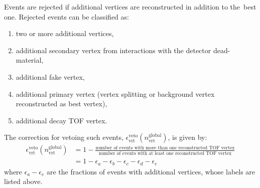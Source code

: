 Events are rejected if additional vertices are reconstructed in addition to the~best one. Rejected events can be classified as:

\begin{enumerate}[label=\alph*)]
	\item two or more additional vertices,
	\item additional  secondary vertex from interactions with the detector dead-material,
	\item additional fake  vertex,
	\item additional primary  vertex (vertex splitting or background vertex reconstructed as best vertex),
	\item additional decay TOF vertex.  
\end{enumerate}
The correction for vetoing such events, $\epsilon_\textrm{vrt}^\textrm{veto}\left(n_\textrm{vrt}^\textrm{global}\right)$, is given by: 
\begin{equation}
\begin{split}
\epsilon_\textrm{vrt}^\textrm{veto}\left(n_\textrm{vrt}^\textrm{global}\right) & =1-\frac{\textrm{number of events with more than one reconstructed  TOF vertex}}{\textrm{number of events with at least one reconstructed TOF vertex}} \\
& =1-\epsilon_a-\epsilon_b-\epsilon_c-\epsilon_d-\epsilon_e
\end{split}
\label{eq:vertexVetoEq}
\end{equation}
where $\epsilon_a-\epsilon_e$ are the fractions of events with additional vertices, whose labels  are listed above.%

